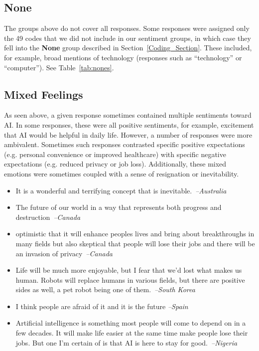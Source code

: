 \documentclass[11pt]{article} %
\newcommand\aff[1]{\textcolor{darkplum}{{\emph{--#1}}}}
\newenvironment{lq2}
{ \vspace{-3pt}
  \begin{itemize}[leftmargin = 4.0em, rightmargin=5.0em, label={}]
    \fontsize{10pt}{10.7pt}\selectfont
    \setlength{\itemsep}{3pt}
    \setlength{\parskip}{2.5pt}
    \setlength{\parsep}{3pt}     }
{ \end{itemize} \vspace{1pt}  }
\def\None/{{\fontfamily{lmss}\selectfont\textbf{None}}}
\begin{document}
\subsection{None}
The groups above do not cover all responses.
Some responses were assigned only the 49 codes that we did not include in our sentiment groups, in which case they fell into the \None/ group described in Section~\ref{Coding_Section}.
These included, for example, broad mentions of technology (responses such as ``technology'' or ``computer''). See Table~\ref{tab:nones}.

\subsection{Mixed Feelings}\label{Mixed_Section}
As seen above, a given response sometimes contained multiple sentiments toward AI. In some responses, these were all positive sentiments, for example, excitement that AI would be helpful in daily life. However, a number of responses were more ambivalent. Sometimes such responses contrasted specific positive expectations (e.g. personal convenience or improved healthcare) with specific negative expectations (e.g. reduced privacy or job loss). Additionally, these mixed emotions were sometimes coupled with a sense of resignation or inevitability. 

\begin{lq2}
\item It is a wonderful and terrifying concept that is inevitable.~\aff{Australia}
\item The future of our world in a way that represents both progress and destruction~\aff{Canada}
\item optimistic that it will enhance peoples lives and bring about breakthroughs in many fields but also skeptical that people will lose their jobs and there will be an invasion of privacy~\aff{Canada}
\item Life will be much more enjoyable, but I fear that we'd lost what makes us human. Robots will replace humans in various fields, but there are positive sides as well, a pet robot being one of them.~\aff{South Korea}
\item I think people are afraid of it and it is the future \aff{Spain}
\item Artificial intelligence is something most people will come to depend on in a few decades. It will make life easier at the same time make people lose their jobs. But one I'm certain of is that AI is here to stay for good.~\aff{Nigeria}
\end{lq2}
\end{document}
